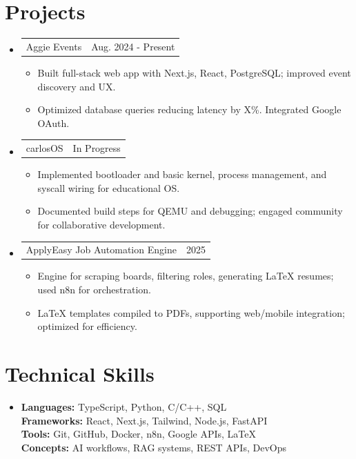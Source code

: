 \documentclass[letterpaper,11pt]{article}
\makeatletter
\newcommand{\resumeItem}[1]{
  \item\small{{#1 \vspace{-2pt}}}
}
\newcommand{\resumeProjectHeading}[2]{
  \item
  \begin{tabular*}{0.97\textwidth}{l@{\extracolsep{\fill}}r}
    \small#1 & #2 \\
  \end{tabular*}\vspace{-7pt}
}
\newcommand{\resumeSubHeadingListStart}{\begin{itemize}[leftmargin=0.15in, label={}]}
\newcommand{\resumeSubHeadingListEnd}{\end{itemize}}
\newcommand{\resumeItemListStart}{\begin{itemize}}
\newcommand{\resumeItemListEnd}{\end{itemize}\vspace{-5pt}}
\makeatother
\begin{document}
\section{Projects}
\resumeSubHeadingListStart
\resumeProjectHeading
{Aggie Events}{Aug. 2024 - Present}
\resumeItemListStart
\resumeItem{Built full-stack web app with Next.js, React, PostgreSQL; improved event discovery and UX.}
\resumeItem{Optimized database queries reducing latency by {X}\%. Integrated Google OAuth.}
\resumeItemListEnd
\resumeProjectHeading
{carlosOS}{In Progress}
\resumeItemListStart
\resumeItem{Implemented bootloader and basic kernel, process management, and syscall wiring for educational OS.}
\resumeItem{Documented build steps for QEMU and debugging; engaged community for collaborative development.}
\resumeItemListEnd
\resumeProjectHeading
{ApplyEasy Job Automation Engine}{2025}
\resumeItemListStart
\resumeItem{Engine for scraping boards, filtering roles, generating LaTeX resumes; used n8n for orchestration.}
\resumeItem{LaTeX templates compiled to PDFs, supporting web/mobile integration; optimized for efficiency.}
\resumeItemListEnd
\resumeSubHeadingListEnd

\section{Technical Skills}
\resumeSubHeadingListStart
\item{
\textbf{Languages:} TypeScript, Python, C/C++, SQL \\
\textbf{Frameworks:} React, Next.js, Tailwind, Node.js, FastAPI \\
\textbf{Tools:} Git, GitHub, Docker, n8n, Google APIs, LaTeX \\
\textbf{Concepts:} AI workflows, RAG systems, REST APIs, DevOps
}
\resumeSubHeadingListEnd
\end{document}
